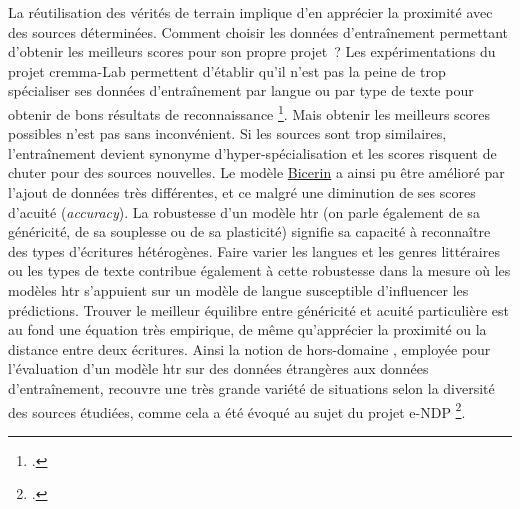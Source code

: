 \documentclass[a4paper,12pt,twoside]{book}
\begin{document}
				La réutilisation des vérités de terrain implique d'en apprécier la
				proximité avec des sources déterminées. Comment choisir les données
				d'entraînement permettant d'obtenir les meilleurs scores pour son propre
				projet~? Les expérimentations du projet \gls{cremma}-Lab permettent d'établir
				qu'il n'est pas la peine de trop spécialiser ses données d'entraînement
				par langue ou par type de texte pour obtenir de bons résultats de
				reconnaissance
				\footcite{campsCremmaLabProjectsTranscription2022}.
				Mais obtenir les meilleurs scores possibles n'est pas sans inconvénient. Si
				les sources sont trop similaires, l'entraînement devient synonyme
				d'hyper-spécialisation et les scores risquent de chuter pour des sources
				nouvelles.
				Le modèle \href{https://github.com/HTR-United/cremma-medieval/releases/tag/1.1.0}{Bicerin} 
				a ainsi pu être \og amélioré \fg{}  par l'ajout de données très différentes, et ce malgré une diminution de ses scores d'acuité (\textit{accuracy}).
				La robustesse d'un modèle \gls{htr} (on parle également de sa généricité, de sa souplesse ou de sa plasticité) signifie sa capacité à reconnaître des types d'écritures hétérogènes.
				Faire varier les langues et les genres
				littéraires ou les types de texte contribue également à cette robustesse
				dans la mesure où les modèles \gls{htr} s'appuient sur un modèle de langue
				susceptible d'influencer les \glspl{prédiction}. Trouver le meilleur équilibre
				entre généricité et acuité particulière est au fond une équation très
				empirique, de même qu'apprécier la proximité ou la distance entre deux
				écritures. Ainsi la notion de \og hors-domaine \fg{} , employée pour
				l'évaluation d'un modèle \gls{htr} sur des données étrangères aux données
				d'entraînement, recouvre une très grande variété de situations selon la
				diversité des sources étudiées, comme cela a été évoqué au sujet du
				projet e-NDP
				\footcite{torresaguilarModelisationAffinageHTR2022}.
				
\end{document}
